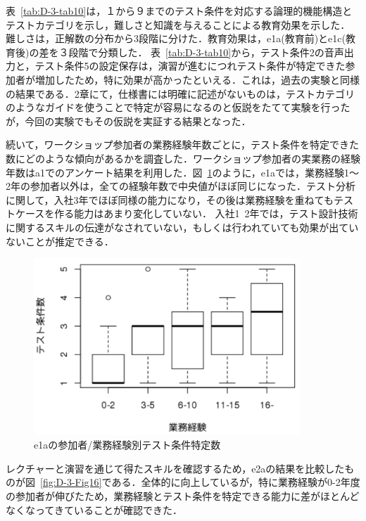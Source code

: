 表~\ref{tab:D-3-tab10}は，１から９までのテスト条件を対応する論理的機能構造とテストカテゴリを示し，難しさと知識を与えることによる教育効果を示した．
難しさは，正解数の分布から3段階に分けた．教育効果は，e1a(教育前)とe1c(教育後)の差を３段階で分類した．
表~\ref{tab:D-3-tab10}から，テスト条件2の音声出力と，テスト条件5の設定保存は，演習が進むにつれテスト条件が特定できた参加者が増加したため，特に効果が高かったといえる．これは，過去の実験と同様の結果である．2章にて，仕様書には明確に記述がないものは，テストカテゴリのようなガイドを使うことで特定が容易になるのと仮説をたてて実験を行ったが，今回の実験でもその仮説を実証する結果となった．

続いて，ワークショップ参加者の業務経験年数ごとに，テスト条件を特定できた数にどのような傾向があるかを調査した．ワークショップ参加者の実業務の経験年数はa1でのアンケート結果を利用した．図~\ref{fig:D-3-Fig15}のように，e1aでは，業務経験1～2年の参加者以外は，全ての経験年数で中央値がほぼ同じになった．テスト分析に関して，入社3年でほぼ同様の能力になり，その後は業務経験を重ねてもテストケースを作る能力はあまり変化していない．
入社1~2年では，テスト設計技術に関するスキルの伝達がなされていない，もしくは行われていても効果が出ていないことが推定できる．
\begin{figure}[htbp]
  \begin{center}
  \includegraphics[width=10cm]{./image/D-3-Fig15.png}
  \caption{e1aの参加者/業務経験別テスト条件特定数}
  \label{fig:D-3-Fig15}
  \end{center}
\end{figure}

レクチャーと演習を通じて得たスキルを確認するため，e2aの結果を比較したものが図~\ref{fig:D-3-Fig16}である．全体的に向上しているが，特に業務経験が0-2年度の参加者が伸びたため，業務経験とテスト条件を特定できる能力に差がほとんどなくなってきていることが確認できた．

